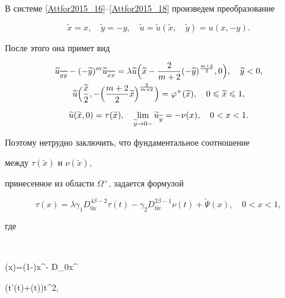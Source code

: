 В системе \eqref{Attfor2015_16}--\eqref{Attfor2015_18} произведем преобразование 

$$\widetilde{x}=x,\quad \widetilde{y}=-y,\quad \widetilde{u}=\widetilde{u}(\widetilde{x},\quad \widetilde{y})=u(x,-y).$$

После этого она примет вид

\begin{gather}

\widetilde{u}_{\widetilde{y}\widetilde{y}}-(-\widetilde{y})^m 

\widetilde{u}_{\widetilde{x}\widetilde{x}}=

\lambda  \widetilde{u}\Bigl( \widetilde{x}-\frac{2}{m+2} 

(-\widetilde{y})^{\frac{m+2}{2}} , 0\Bigr) ,\quad \widetilde{y}<0,

\\

\widetilde{u}\Bigl(\frac{\widetilde{x}}{2},-\Bigl( \frac{m+2}{2}

 \widetilde{x}\Bigr)^{\frac{2}{m+2}} \Bigr)=\varphi^+(\widetilde{x}) 

 ,\quad 0\leqslant \widetilde{x}\leqslant 1,

\\[2mm]

\widetilde{u}(\widetilde{x} , 0)=\tau(\widetilde{x}) , \quad 

 \lim\limits_{\widetilde{y}\rightarrow 0-}\widetilde{u}_{\widetilde{y}}=-\nu(x) ,\quad 0<x<1.

\end{gather}

Поэтому нетрудно заключить, что фундаментальное соотношение

между $\tau(\widetilde{x})$ и $\nu(\widetilde{x})$,

 принесенное из области $\Omega^+$, задается формулой

\begin{equation}

\label{Attfor2015_19}

\tau(x)=\lambda\gamma_1 D_{0x}^{4\beta-2}\tau(t)-

\gamma_2 D_{0x}^{2\beta-1}\nu(t)+\widetilde{\Psi}(x), \quad 0<x<1,

\end{equation}

где

$$

\widetilde{\Psi}(x)=\gamma\Gamma(1-\beta)x^{-\beta} D_{0x}^{}

\bigl(t\widetilde{\psi}'(t)+\beta\widetilde{\psi}(t)\bigr)t^{2},

